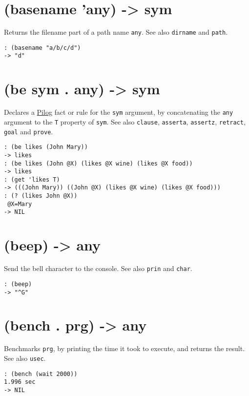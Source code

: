 {\section{(basename 'any) -> sym}
\label{sec-8-1-2-6}


Returns the filename part of a path name \texttt{any}. See also \texttt{dirname} and
\texttt{path}.


\begin{verbatim}
: (basename "a/b/c/d")
-> "d"
\end{verbatim}

 
\section{(be sym . any) -> sym}
\label{sec-8-1-2-7}


Declares a \hyperref[ref.html-pilog]{Pilog} fact or rule for the \texttt{sym}
argument, by concatenating the \texttt{any} argument to the \texttt{T} property of
\texttt{sym}. See also \texttt{clause}, \texttt{asserta}, \texttt{assertz}, \texttt{retract}, \texttt{goal} and
\texttt{prove}.


\begin{verbatim}
: (be likes (John Mary))
-> likes
: (be likes (John @X) (likes @X wine) (likes @X food))
-> likes
: (get 'likes T)
-> (((John Mary)) ((John @X) (likes @X wine) (likes @X food)))
: (? (likes John @X))
 @X=Mary
-> NIL
\end{verbatim}

 
\section{(beep) -> any}
\label{sec-8-1-2-8}


Send the bell character to the console. See also \texttt{prin} and \texttt{char}.


\begin{verbatim}
: (beep)
-> "^G"
\end{verbatim}

 
\section{(bench . prg) -> any}
\label{sec-8-1-2-9}


Benchmarks \texttt{prg}, by printing the time it took to execute, and returns
the result. See also \texttt{usec}.


\begin{verbatim}
: (bench (wait 2000))
1.996 sec
-> NIL
\end{verbatim}

}
